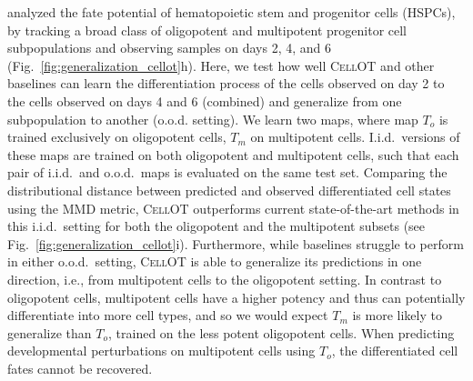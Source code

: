 
\citet{weinreb2020lineage} analyzed the fate potential of hematopoietic stem and progenitor cells (HSPCs), by tracking a broad class of oligopotent %
and multipotent %
 progenitor cell subpopulations and observing samples on days 2, 4, and 6 (Fig.~\ref{fig:generalization_cellot}h).
Here, we test how well \textsc{CellOT} and other baselines can learn the differentiation process of the cells observed on day 2 to the cells observed on days 4 and 6 (combined) and generalize from one subpopulation to another (o.o.d. setting).
We learn two maps, where map $T_o$ is trained exclusively on oligopotent cells, $T_m$ on multipotent cells.
I.i.d.~versions of these maps are trained on both oligopotent and multipotent cells, such that each pair of i.i.d.~and o.o.d.~maps is evaluated on the same test set.
Comparing the distributional distance between predicted and observed differentiated cell states using the MMD metric, \textsc{CellOT} outperforms current state-of-the-art methods in this i.i.d.~setting for both the oligopotent and the multipotent subsets (see Fig.~\ref{fig:generalization_cellot}i).
Furthermore, while baselines struggle to perform in either o.o.d.~setting, \textsc{CellOT} is able to generalize its predictions in one direction, i.e., from multipotent cells to the oligopotent setting.
In contrast to oligopotent cells, multipotent cells have a higher potency and thus can potentially differentiate into more cell types, and so we would expect $T_m$ is more likely to generalize than $T_o$, trained on the less potent oligopotent cells.
When predicting developmental perturbations on multipotent cells using $T_o$, the differentiated cell fates cannot be recovered.

